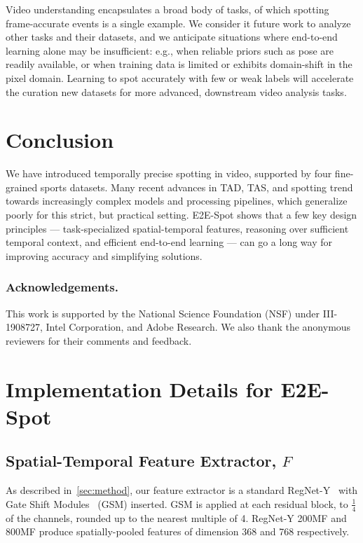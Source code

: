 \documentclass[runningheads]{llncs}
\newcommand{\notation}[1]{\ensuremath{#1}\xspace}
\newcommand{\OURMETHOD}{{E2E-Spot}\xspace}
\newcommand{\FeatureExtractor}{\notation{F}}
\begin{document}
Video understanding encapsulates a broad body of tasks, of which spotting frame-accurate events is a single example.
We consider it future work to analyze other tasks and their datasets, and we  anticipate situations where end-to-end learning alone may be insufficient:
e.g., when reliable priors such as pose are readily available, or when training data is limited or exhibits domain-shift in the pixel domain.
Learning to spot accurately with few or weak labels will accelerate the curation new datasets for more advanced, downstream video analysis tasks.
 
\section{Conclusion}

We have introduced temporally precise spotting in video, supported by four fine-grained sports datasets.
Many recent advances in TAD, TAS, and spotting trend towards increasingly complex models and processing pipelines, which generalize poorly for this strict, but practical setting.
\OURMETHOD shows that a few key design principles --- task-specialized
spatial-temporal features, reasoning over sufficient temporal context, and efficient end-to-end learning --- can go a long way for improving accuracy and simplifying solutions.

 
\subsubsection*{Acknowledgements.}
This work is supported by the National Science Foundation (NSF) under III-1908727, Intel Corporation, and Adobe Research.
We also thank the anonymous reviewers for their comments and feedback. 
\appendix

\section{Implementation Details for \OURMETHOD}
\label{sec:supp_our_impl}

\subsection{Spatial-Temporal Feature Extractor, \FeatureExtractor}

As described in~\autoref{sec:method}, our feature extractor is a standard RegNet-Y~\cite{regnet} with Gate Shift Modules~\cite{gsm} (GSM) inserted.
GSM is applied at each residual block, to $\frac{1}{4}$ of the channels, rounded up to the nearest multiple of 4.
RegNet-Y 200MF and 800MF produce spatially-pooled features of dimension 368 and 768 respectively.
\end{document}
